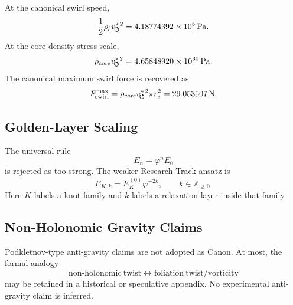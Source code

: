         At the canonical swirl speed,
        \[
            \frac{1}{2}\rho_{\!f}v_{\!\boldsymbol{\circlearrowleft}}^{\ast}{}^2
            =
            4.18774392\times10^5\,\mathrm{Pa}.
        \]
        At the core-density stress scale,
        \[
            \rho_{\text{core}}v_{\!\boldsymbol{\circlearrowleft}}^{\ast}{}^2
            =
            4.65848920\times10^{30}\,\mathrm{Pa}.
        \]
        The canonical maximum swirl force is recovered as
        \[
            F_{\text{swirl}}^{\max}
            =
            \rho_{\text{core}}v_{\!\boldsymbol{\circlearrowleft}}^{\ast}{}^2\pi r_c^2
            =
            29.053507\,\mathrm{N}.
        \]
    
    \subsection{Golden-Layer Scaling}
        
        The universal rule
        \[
            E_n=\varphi^nE_0
        \]
        is rejected as too strong. The weaker Research Track ansatz is
        \[
            E_{K,k}
            =
            E_K^{(0)}\varphi^{-2k},
            \qquad
            k\in\mathbb Z_{\ge0}.
        \]
        Here \(K\) labels a knot family and \(k\) labels a relaxation layer inside
        that family.
    
    \subsection{Non-Holonomic Gravity Claims}
        
        Podkletnov-type anti-gravity claims are not adopted as Canon. At most, the
        formal analogy
        \[
            \mathrm{non\mbox{-}holonomic\ twist}
            \longleftrightarrow
            \mathrm{foliation\ twist/vorticity}
        \]
        may be retained in a historical or speculative appendix.
        No experimental anti-gravity claim is inferred.
        
